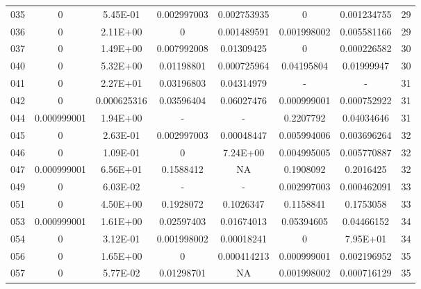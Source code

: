 {\begin{longtable}{cccccccc}
035 & {\color{red}0} & 5.45E-01 & {\color{red}0.002997003} & {\color{red}0.002753935} & {\color{red}0} & {\color{red}0.001234755} & 29 \\
036 & {\color{red}0} & 2.11E+00 & {\color{red}0} & {\color{red}0.001489591} & {\color{red}0.001998002} & {\color{red}0.005581166} & 29 \\
037 & {\color{red}0} & 1.49E+00 & {\color{red}0.007992008} & {\color{red}0.01309425} & {\color{red}0} & {\color{red}0.000226582} & 30 \\
040 & {\color{red}0} & 5.32E+00 & {\color{red}0.01198801} & {\color{red}0.000725964} & {\color{red}0.04195804} & {\color{red}0.01999947} & 30 \\
041 & {\color{red}0} & 2.27E+01 & {\color{red}0.03196803} & {\color{red}0.04314979} & - & - &  31 \\
042 & {\color{red}0} & {\color{red}0.000625316} & {\color{red}0.03596404} & 0.06027476 & {\color{red}0.000999001} & {\color{red}0.000752922} & 31 \\
044 & {\color{red}0.000999001} & 1.94E+00 & - & - &  0.2207792 & {\color{red}0.04034646} & 31 \\
045 & {\color{red}0} & 2.63E-01 & {\color{red}0.002997003} & {\color{red}0.00048447} & {\color{red}0.005994006} & {\color{red}0.003696264} & 32 \\
046 & {\color{red}0} & 1.09E-01 & {\color{red}0} & 7.24E+00 & {\color{red}0.004995005} & {\color{red}0.005770887} & 32 \\
047 & {\color{red}0.000999001} & 6.56E+01 & 0.1588412 & NA & 0.1908092 & 0.2016425 & 32 \\
049 & {\color{red}0} & 6.03E-02 & - & - &  {\color{red}0.002997003} & {\color{red}0.000462091} & 33 \\
051 & {\color{red}0} & 4.50E+00 & 0.1928072 & 0.1026347 & 0.1158841 & 0.1753058 & 33 \\
053 & {\color{red}0.000999001} & 1.61E+00 & {\color{red}0.02597403} & {\color{red}0.01674013} & 0.05394605 & {\color{red}0.04466152} & 34 \\
054 & {\color{red}0} & 3.12E-01 & {\color{red}0.001998002} & {\color{red}0.00018241} & {\color{red}0} & 7.95E+01 & 34 \\
056 & {\color{red}0} & 1.65E+00 & {\color{red}0} & {\color{red}0.000414213} & {\color{red}0.000999001} & {\color{red}0.002196952} & 35 \\
057 & {\color{red}0} & 5.77E-02 & {\color{red}0.01298701} & NA & {\color{red}0.001998002} & {\color{red}0.000716129} & 35 \\

\end{longtable}}
